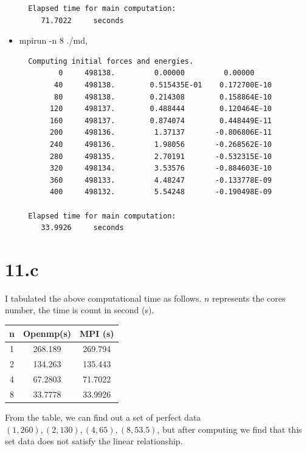 \documentclass{article}
\begin{document}
\begin{itemize}
{{\begin{verbatim}
  Elapsed time for main computation:
     71.7022     seconds
   \end{verbatim}   }}





  \item mpirun -n 8 ./md,
  {\tiny{\begin{verbatim}
  Computing initial forces and energies.
         0     498138.         0.00000         0.00000
        40     498138.        0.515435E-01    0.172700E-10
        80     498138.        0.214308        0.158864E-10
       120     498137.        0.488444        0.120464E-10
       160     498137.        0.874074        0.448449E-11
       200     498136.         1.37137       -0.806806E-11
       240     498136.         1.98056       -0.268562E-10
       280     498135.         2.70191       -0.532315E-10
       320     498134.         3.53576       -0.884603E-10
       360     498133.         4.48247       -0.133778E-09
       400     498132.         5.54248       -0.190498E-09

  Elapsed time for main computation:
     33.9926     seconds
   \end{verbatim}   }}


   \end{itemize}




\newpage

\section*{11.c}
I tabulated the above computational time as follows. $n$ represents the cores number, the time is count in second (s).

\begin{table}[H]
\centering
\begin{tabular}{ccc}\\\hline
n &  Openmp(s) &  MPI (s)\\\hline
1 & 268.189 & 269.794\\
2 & 134.263 & 135.443\\
4 & 67.2803 & 71.7022\\
8 &  33.7778&  33.9926\\\hline
\end{tabular}
\end{table}

From the table, we can find out a set of perfect data $(1,260), (2,130),(4,65), (8,53.5)$, but after computing we find that this set data does not satisfy the linear relationship.
\end{document}
